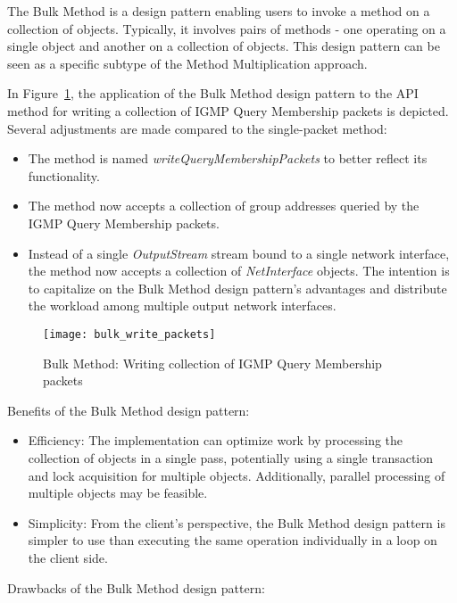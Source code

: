 The Bulk Method is a design pattern enabling users to invoke a method on a collection of objects.
Typically, it involves pairs of methods - one operating on a single object and another on a collection of objects.
This design pattern can be seen as a specific subtype of the Method Multiplication approach.

In Figure~\ref{fig:bulk_write_packets}, the application of the Bulk Method design pattern to the API method
for writing a collection of IGMP Query Membership packets is depicted.
Several adjustments are made compared to the single-packet method:

\begin{itemize}
    \item
    The method is named \textit{writeQueryMembershipPackets} to better reflect its functionality.
    \item
    The method now accepts a collection of group addresses queried by the IGMP Query Membership packets.
    \item
    Instead of a single \textit{OutputStream} stream bound to a single network interface, the method now accepts
    a collection of \textit{NetInterface} objects.
    The intention is to capitalize on the Bulk Method design pattern's advantages and distribute the workload among
    multiple output network interfaces.
\end{itemize}

\begin{figure}[!htb]
    \centering
    \texttt{[image: bulk\_write\_packets]}
    \caption{Bulk Method: Writing collection of IGMP Query Membership packets}
    \label{fig:bulk_write_packets}
\end{figure}

Benefits of the Bulk Method design pattern:

\begin{itemize}
    \item Efficiency:
    The implementation can optimize work by processing the collection of objects in a single pass,
    potentially using a single transaction and lock acquisition for multiple objects.
    Additionally, parallel processing of multiple objects may be feasible.
    \item Simplicity:
    From the client's perspective, the Bulk Method design pattern is simpler to use than executing the same operation
    individually in a loop on the client side.
\end{itemize}

Drawbacks of the Bulk Method design pattern:

